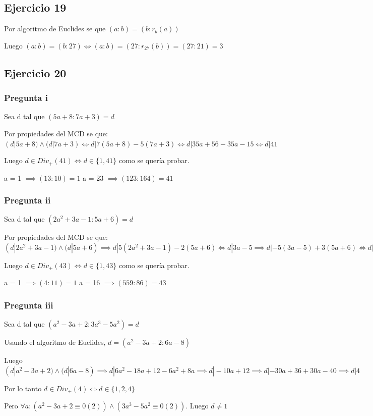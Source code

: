 \subsection{Ejercicio 19}
Por algoritmo de Euclides se que $ (a:b) = (b:r_b(a)) $ 

Luego $(a:b) = (b:27) \iff (a:b) = (27:r_{27}(b)) = (27:21) = 3$

\subsection{Ejercicio 20}
\subsubsection{Pregunta i}
Sea d tal que $ (5a+8:7a+3) = d $

Por propiedades del MCD se que: $ (d|5a+8) \wedge (d|7a+3) \iff d|7(5a+8) - 5(7a+3) \iff d|35a+56-35a-15 \iff d|41$

Luego $ d \in Div_+(41) \iff d \in \{ 1,41 \} $ como se quería probar.

a = 1 $ \implies (13:10) = 1 $
a = 23 $ \implies (123:164) = 41 $

\subsubsection{Pregunta ii}
Sea d tal que $ (2a^2+3a-1:5a+6) = d $

Por propiedades del MCD se que: $ (d|2a^2+3a-1) \wedge (d|5a+6) \implies d|5(2a^2+3a-1) - 2(5a+6) \iff d|3a-5 \implies d|-5(3a-5)+3(5a+6)
\iff d|-15a+25+15a+18 \iff d|43 $


Luego $ d\in Div_+(43) \iff d \in \{ 1,43 \} $ como se quería probar.

a = 1 $ \implies (4:11) = 1 $
a = 16 $ \implies (559:86) = 43 $

\subsubsection{Pregunta iii}
Sea d tal que $ (a^2-3a+2:3a^3-5a^2) = d $

Usando el algoritmo de Euclides, $ d = (a^2-3a+2:6a-8) $

Luego $ (d|a^2-3a+2) \wedge (d|6a-8) \implies d|6a^2-18a+12-6a^2+8a \implies d|-10a+12 \implies d|-30a+36+30a-40 \implies d|4$

Por lo tanto $ d \in Div_+(4) \iff d \in \{ 1,2,4 \} $

Pero $ \forall a: (a^2-3a+2 \equiv 0 (2)) \wedge (3a^3-5a^2 \equiv 0 (2))$. Luego $d \neq 1$

